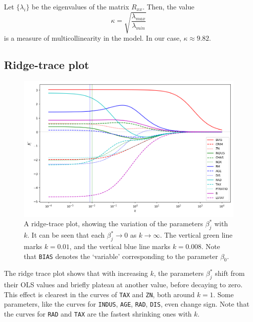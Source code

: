 \documentclass[10pt]{article}
\begin{document}
    Let $\{\lambda_i\}$ be the eigenvalues of the matrix $R_{xx}$. Then, the value
    \[
        \kappa = \sqrt{\frac{\lambda_{max}}{\lambda_{min}}}
    \] is a measure of multicollinearity in the model. In our case, $\kappa \approx
    9.82$.



    \subsection{Ridge-trace plot}


    \begin{figure}[H]
    \begin{center}
        \includegraphics[width=\textwidth]{ridgetrace.png}
    \end{center}
    \caption{
        A ridge-trace plot, showing the variation of the parameters $\beta_j^*$ with
        $k$. It can be seen that each $\beta_j^* \to 0$ as $k \to \infty$. The
        vertical green line marks $k = 0.01$, and the vertical blue line marks $k =
        0.008$. Note that \texttt{BIAS} denotes the `variable' corresponding to the
        parameter $\beta_0$.
    }
    \label{fig:ridge_trace}
    \end{figure}

    The ridge trace plot shows that with increasing $k$, the parameters $\beta_j^*$
    shift from their OLS values and briefly plateau at another value, before decaying
    to zero. This effect is clearest in the curves of \texttt{TAX} and \texttt{ZN},
    both around $k = 1$. Some parameters, like the curves for \texttt{INDUS},
    \texttt{AGE}, \texttt{RAD}, \texttt{DIS}, even change sign. Note that the curves
    for \texttt{RAD} and \texttt{TAX} are the fastest shrinking ones with $k$.
\end{document}

